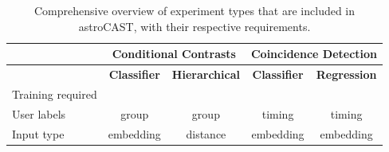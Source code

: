 \documentclass[utf8]{FrontiersinHarvard}
\newcommand{\cmark}{\ding{51}} %
\newcommand{\xmark}{\textemdash} %
\begin{document}
    \bgroup
    \def\arraystretch{1.5}
    \begin{table}[htb]
        \centering
        \caption{Comprehensive overview of experiment types that are included in astroCAST, with their respective requirements.\newline}
        \label{tab:experiments}
        \begin{tabular}{|l|c|c|c|c|}
            \hline
            & \multicolumn{2}{c|}{\textbf{Conditional Contrasts}} & \multicolumn{2}{c|}{\textbf{Coincidence Detection}} \\ \hline
            & \textbf{Classifier} & \textbf{Hierarchical} & \textbf{Classifier} & \textbf{Regression} \\ \hline
            Training required & \cmark              & \xmark                & \cmark              & \cmark              \\ \hline
            User labels       & group               & group                 & timing              & timing              \\ \hline
            Input type        & embedding           & distance              & embedding           & embedding           \\ \hline
        \end{tabular}
    \end{table}
    \egroup
\end{document}
